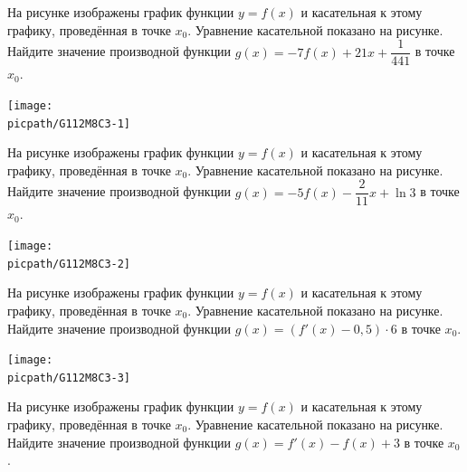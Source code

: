 \begin{class}[number=3]
\begin{listofex}
\begin{minipage}[t]{\picwidth}
		\end{minipage}
		\item
		\begin{minipage}[t]{\bodywidth}
			На рисунке изображены график функции \(y=f(x)\) и касательная к этому графику, проведённая в точке \(x_0\). Уравнение касательной показано на рисунке. Найдите значение производной функции \(g(x)=-7f(x)+21x+\dfrac{ 1 }{ 441 }\) в точке \(x_0\).
		\end{minipage}
		\hspace{0.02\linewidth}
		\begin{minipage}[t]{\picwidth}
			\texttt{[image: \\picpath/G112M8C3-1]}
		\end{minipage}
		\item
		\begin{minipage}[t]{\bodywidth}
			На рисунке изображены график функции \(y=f(x)\) и касательная к этому графику, проведённая в точке \(x_0\). Уравнение касательной показано на рисунке. Найдите значение производной функции \(g(x)=-5f(x)-\dfrac{ 2 }{ 11 }x+\ln3\) в точке \(x_0\).
		\end{minipage}
		\hspace{0.02\linewidth}
		\begin{minipage}[t]{\picwidth}
			\texttt{[image: \\picpath/G112M8C3-2]}
		\end{minipage}
		\item
		\begin{minipage}[t]{\bodywidth}
			На рисунке изображены график функции \(y=f(x)\) и касательная к этому графику, проведённая в точке \(x_0\). Уравнение касательной показано на рисунке. Найдите значение производной функции \(g(x)=(f'(x)-0,5)\cdot 6\) в точке \(x_0\).
		\end{minipage}
		\hspace{0.02\linewidth}
		\begin{minipage}[t]{\picwidth}
			\texttt{[image: \\picpath/G112M8C3-3]}
		\end{minipage}
		\item
		\begin{minipage}[t]{\bodywidth}
			На рисунке изображены график функции \(y=f(x)\) и касательная к этому графику, проведённая в точке \(x_0\). Уравнение касательной показано на рисунке. Найдите значение производной функции \(g(x)=f'(x)-f(x)+3\) в точке \(x_0\).
		\end{minipage}

\end{listofex}
\end{class}

